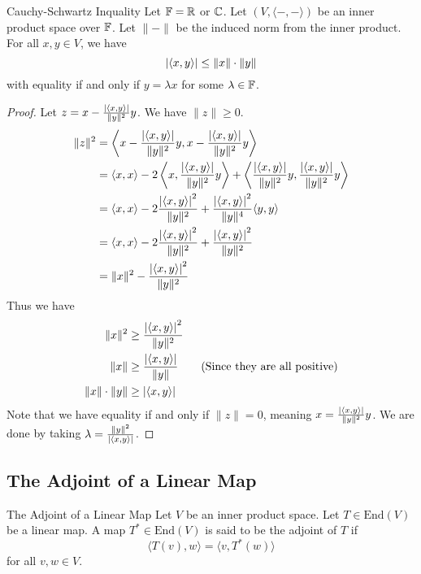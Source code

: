 \documentclass[a4paper]{article}
\begin{document}
\begin{prp}{Cauchy-Schwartz Inquality}{} Let $\mathbb{F}=\mathbb{R}$ or $\mathbb{C}$. Let $(V,\langle-,-\rangle)$ be an inner product space over $\mathbb{F}$. Let $\|-\|$ be the induced norm from the inner product. For all $x,y\in V$, we have $$\abs{\langle x,y\rangle}\leq\|x\|\cdot\|y\|$$ with equality if and only if $y=\lambda x$ for some $\lambda\in\mathbb{F}$. 
\begin{proof} Let $z=x-\frac{\abs{\langle x,y\rangle}}{\|y\|^2}y$. We have $\|z\|\geq0$. 
\begin{align*}
\|z\|^2&=\left\langle x-\frac{\abs{\langle x,y\rangle}}{\|y\|^2}y,x-\frac{\abs{\langle x,y\rangle}}{\|y\|^2}y\right\rangle\\
&=\langle x,x\rangle-2\left\langle x,\frac{\abs{\langle x,y\rangle}}{\|y\|^2}y\right\rangle+\left\langle \frac{\abs{\langle x,y\rangle}}{\|y\|^2}y,\frac{\abs{\langle x,y\rangle}}{\|y\|^2}y\right\rangle\\
&=\langle x,x\rangle-2\frac{\abs{\langle x,y\rangle}^2}{\|y\|^2}+\frac{\abs{\langle x,y\rangle}^2}{\|y\|^4}\langle y,y\rangle\\
&=\langle x,x\rangle-2\frac{\abs{\langle x,y\rangle}^2}{\|y\|^2}+\frac{\abs{\langle x,y\rangle}^2}{\|y\|^2}\\
&=\|x\|^2-\frac{\abs{\langle x,y\rangle}^2}{\|y\|^2}\\
\end{align*}
Thus we have
\begin{align*}
\|x\|^2&\geq\frac{\abs{\langle x,y\rangle}^2}{\|y\|^2}\\
\|x\|&\geq\frac{\abs{\langle x,y\rangle}}{\|y\|}\tag{Since they are all positive}\\
\|x\|\cdot\|y\|&\geq\abs{\langle x,y\rangle}
\end{align*}
Note that we have equality if and only if $\|z\|=0$, meaning $x=\frac{\abs{\langle x,y\rangle}}{\|y\|^2}y$. We are done by taking $\lambda=\frac{\|y\|^2}{\abs{\langle x,y\rangle}}$. 
\end{proof}
\end{prp}
\subsection{The Adjoint of a Linear Map}
\begin{defn}{The Adjoint of a Linear Map}{} Let $V$ be an inner product space. Let $T\in\text{End}(V)$ be a linear map. A map $T^\ast\in\text{End}(V)$ is said to be the adjoint of $T$ if $$\langle T(v), w\rangle=\langle v, T^\ast(w)\rangle$$ for all $v,w\in V$. 
\end{defn}
\end{document}
